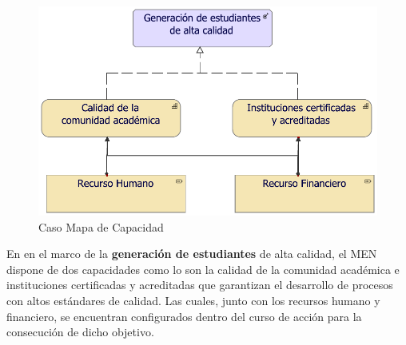 \begin{figure}[h!]
	\centering
	\includegraphics[width=.7\linewidth]{imgs/modelo/estrategia/capacidad/2.pdf}
	\caption{Caso Mapa de Capacidad}
\end{figure}

En en el marco de la \textbf{generación de estudiantes} de alta calidad, el MEN dispone de dos capacidades como lo son la calidad de la comunidad académica e instituciones certificadas y acreditadas que garantizan el desarrollo de procesos con altos estándares de calidad. Las cuales, junto con los recursos humano y financiero, se encuentran configurados dentro del curso de acción para la consecución de dicho objetivo.